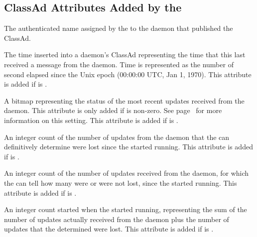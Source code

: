 \subsection*{\label{sec:Collector-Added-Attributes}ClassAd Attributes Added by the }

\begin{description}

\item[\AdAttr{AuthenticatedIdentity}:] The authenticated name assigned
  by the  to the daemon that published the ClassAd.

\item[\AdAttr{LastHeardFrom}:] The time inserted into a daemon's
  ClassAd representing the time that this 
  last received a message from the daemon.
  Time is  represented as the number of second elapsed since
  the Unix epoch (00:00:00 UTC, Jan 1, 1970).
  This attribute is added if  is .

\item[\AdAttr{UpdatesHistory}:] A bitmap representing the status of
  the most recent updates received from the daemon. 
  This attribute is only added if 
  is non-zero. 
  See page~\pageref{param:CollectorDaemonHistorySize} for more information on
  this setting.
  This attribute is added if  is .

\item[\AdAttr{UpdatesLost}:] An integer count of the number of updates
  from the daemon that the  can definitively determine
  were lost since the  started running.
  This attribute is added if  is .

\item[\AdAttr{UpdatesSequenced}:] An integer count of the number of updates
  received from the daemon,
  for which the  can tell how many were or were not lost,
  since the  started running.
  This attribute is added if  is .

\item[\AdAttr{UpdatesTotal}:] An integer count started when the
   started running, representing the sum
  of the number of updates actually received from the daemon plus
  the number of updates that the  determined were lost.
  This attribute is added if  is .

\end{description}


